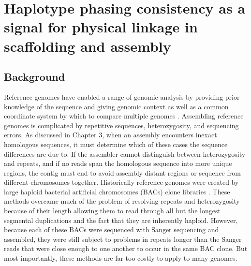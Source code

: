 %
\chapter{Haplotype phasing consistency as a signal for physical linkage in scaffolding and assembly}

\ifpdf
    \graphicspath{{Chapter4/Figs/Raster/}{Chapter4/Figs/PDF/}{Chapter4/Figs/}}
\else
    \graphicspath{{Chapter4/Figs/Vector/}{Chapter4/Figs/}}
\fi



\section{Background}
\par{
Reference genomes have enabled a range of genomic analysis by providing prior knowledge of the sequence 
and giving genomic context as well as a common coordinate system by which to compare multiple genomes \cite{1000genomes} \cite{GRCh38}. Assembling reference genomes is complicated by repetitive sequences, heterozygosity, and sequencing errors. As discussed in Chapter 3, when an assembly encounters inexact homologous sequences, it must determine which of these cases the sequence differences are due to. 
If the assembler cannot distinguish between heterozygosity and repeats, and if no reads span the homologous sequence into more unique regions, the contig must end
to avoid assembly distant regions or sequence from different chromosomes together. Historically reference genomes were created by large haploid bacterial artificial chromosomes (BACs) clone libraries \cite{human}. 
These methods overcame much of the problem of resolving repeats and heterozygosity because of their length allowing them to read through all but the longest segmental duplications and the fact that they are inherently haploid. However, because each of these BACs were sequenced with Sanger sequencing and assembled, they were still subject to problems in repeats longer than the Sanger reads that were close enough to one another to occur in the same BAC clone. But most importantly, these methods are far too costly to apply to many genomes. 
} \\

